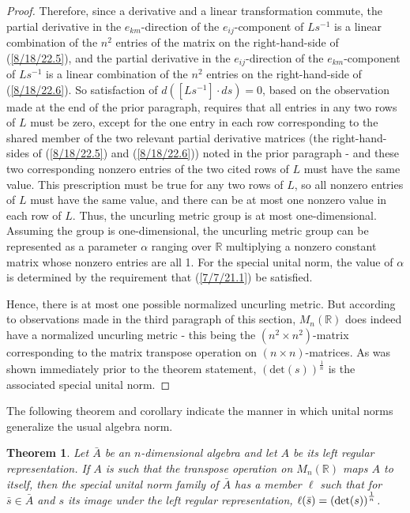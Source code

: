 \documentclass{amsart}
\numberwithin{equation}{section}
\newtheorem{theorem}{Theorem}
\theoremstyle{definition}
\numberwithin{theorem}{section}
\begin{document}
\begin{proof}
Therefore, since a derivative and a linear transformation commute, the partial derivative in the $e_{km}$-direction of the $e_{ij}$-component of $Ls^{-1}$ is a linear combination of the $n^2$ entries of the matrix on the right-hand-side of (\ref{8/18/22.5}), and  the partial derivative in the $e_{ij}$-direction of the $e_{km}$-component of $Ls^{-1}$ is a linear combination of the $n^2$ entries on the right-hand-side of (\ref{8/18/22.6}).
So satisfaction of \mbox{$d\left([Ls^{-1}]\cdot ds\right) = 0$,} based on the observation made at the end of the prior paragraph, requires that all entries in any two rows of $L$ must be zero, except for the one entry in each row corresponding to the shared member of the two relevant partial derivative matrices (the right-hand-sides of (\ref{8/18/22.5}) and (\ref{8/18/22.6})) noted in the prior paragraph - and these two corresponding nonzero entries of the two cited rows of $L$ must have the same value.  This prescription must be true for any two rows of $L$, so all nonzero entries of $L$ must have the same value, and there can be at most one nonzero value in each row of $L$.  Thus, the uncurling metric group is at most one-dimensional. Assuming the group is one-dimensional, the uncurling metric group can be represented as a parameter $\alpha$ ranging over $\mathbb{R}$ multiplying a nonzero constant matrix whose nonzero entries are all 1.  
For the special unital norm, the value of $\alpha$ is determined by the requirement that (\ref{7/7/21.1}) be satisfied. 

Hence, there is at most one possible normalized uncurling metric.  But according to observations made in the third paragraph of this section, $ M_n(\mathbb{R})$ does indeed have a normalized uncurling metric - this being the $(n^2\times n^2)$-matrix corresponding to the matrix transpose operation on $(n\times n)$-matrices.  As was shown immediately prior to the theorem statement, $(\mbox{det}(s))^{\frac{1}{n}}$ is the associated special unital norm.  
 \end{proof}
 
 The following theorem and corollary indicate the manner in which unital norms generalize the usual algebra norm.
 
 \newpage
 
 \begin{theorem}\label{5/13/22.1} Let $\bar{A}$ be an $n$-dimensional algebra and let $A$ be its left regular representation.  If $A$ is such that the transpose operation on $ M_n(\mathbb{R})$ maps $A$ to itself, then the special unital norm family of $\bar{A}$ has a member $\ell$ such that  for $\bar{s}\in\bar{A}$ and $s$ its image under the left regular representation, $\ell(\bar{s}) = \left({\rm det}(s)\right)^{\frac{1}{n}}$. 
\end{theorem}
\end{document}

